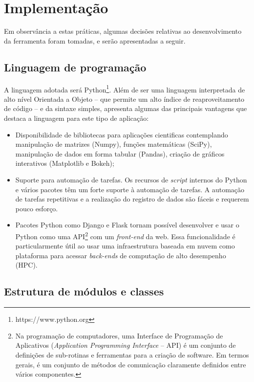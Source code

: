 \section{Implementação}


Em observância a estas práticas, algumas decisões relativas ao desenvolvimento da ferramenta foram tomadas, e serão apresentadas a seguir.


\subsection{Linguagem de programação}

A linguagem adotada será Python\footnote{https://www.python.org}. Além de ser uma linguagem interpretada de alto nível Orientada a Objeto -- que permite um alto índice de reaproveitamento de código -- e da sintaxe simples,  apresenta algumas das principais vantagens que destaca a linguagem para este tipo de aplicação:

\begin{itemize}
    \item Disponibilidade de bibliotecas para aplicações cientificas contemplando manipulação de matrizes (Numpy), funções matemáticas (SciPy), manipulação de dados em forma tabular (Pandas), criação de gráficos interativos (Matplotlib e Bokeh);

    \item Suporte para automação de tarefas. Os recursos de \textit{script} internos do Python e vários pacotes têm um forte suporte à automação de tarefas. A automação de tarefas repetitivas e a realização do registro de dados são fáceis e requerem pouco esforço.

    \item Pacotes Python como Django e Flask tornam possível desenvolver e usar o Python como uma API\footnote{Na programação de computadores, uma Interface de Programação de Aplicativos (\textit{Application Programming Interface} -- API) é um conjunto de definições de sub-rotinas e ferramentas para a criação de software. Em termos gerais, é um conjunto de métodos de comunicação claramente definidos entre vários componentes.} com um \textit{front-end} da web. Essa funcionalidade é particularmente útil ao usar uma infraestrutura baseada em nuvem como plataforma para acessar \textit{back-ends} de computação de alto desempenho (HPC).
\end{itemize}


\subsection{Estrutura de módulos e classes}

